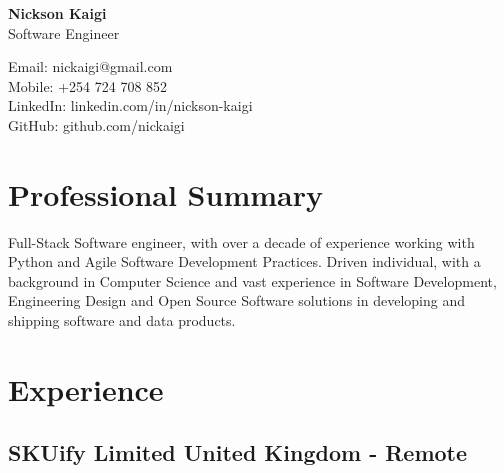 \documentclass[11pt]{article} %
\begin{document}
\begin{center}
    \begin{minipage}{0.5\textwidth}
    {\Huge\bfseries
        Nickson Kaigi
        } \\ \medskip
        Software Engineer
    \end{minipage} \hfill
    \begin{minipage}{0.4\textwidth}
        \raggedleft
        Email: nickaigi@gmail.com \\
        Mobile: +254 724 708 852 \\
        LinkedIn: linkedin.com/in/nickson-kaigi \\
        GitHub: github.com/nickaigi
    \end{minipage}
\end{center}

\section{Professional Summary}
Full-Stack Software engineer, with over a decade of experience working with Python and Agile Software Development Practices. Driven individual, with a background in Computer Science and vast experience in Software Development, Engineering Design and Open Source Software solutions in developing and shipping software and data products.

\section{Experience}
\subsection{SKUify Limited \hfill United Kingdom - Remote}
\end{document}
